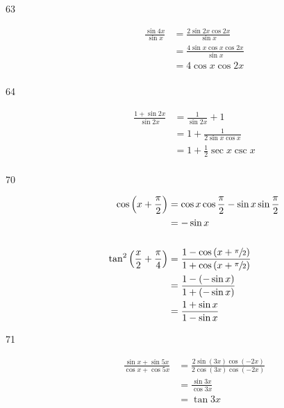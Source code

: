 \documentclass{exam}
\begin{document}
\begin{description}
      \item[63]
        \begin{align*}
          \frac{\sin 4x}{\sin x} & = \frac{2 \sin 2x \cos 2x}{\sin x} \\
                                 & = \frac{4 \sin x \cos x \cos 2x}{\sin x} \\
                                 & = 4 \cos x \cos 2x \\
        \end{align*}

      \item[64]
        \begin{align*}
          \frac{1 + \sin 2x}{\sin 2x} & = \frac{1}{\sin 2x} + 1 \\
                                      & = 1 + \frac{1}{2 \sin x \cos x} \\
                                      & = 1 + \frac{1}{2} \sec x \csc x \\
        \end{align*}

      \item[70]
        \begin{align*}
          \cos \left( x + \frac{\pi}{2} \right) & = \cos x \cos \frac{\pi}{2} - \sin x \sin \frac{\pi}{2} \\
                                                & = - \sin x \\
          \\
          \tan^2 \left( \frac{x}{2} + \frac{\pi}{4} \right) 
            &= \frac{1 - \cos \left( x + \sfrac{\pi}{2} \right)}{1 + \cos \left( x + \sfrac{\pi}{2} \right)} \\
            &= \frac{1 - (- \sin x)}{1 + (- \sin x)} \\
            &= \frac{1 + \sin x}{1 - \sin x} \\
        \end{align*}

      \item[71]
        \begin{align*}
          \frac{\sin x + \sin 5x}{\cos x + \cos 5x} & = \frac{2 \sin (3x) \cos (-2x)}{2 \cos(3x) \cos (-2x)} \\
                                                    & = \frac{\sin 3x}{\cos 3x} \\
                                                    & = \tan 3x \\
        \end{align*}


\end{description}
\end{document}
